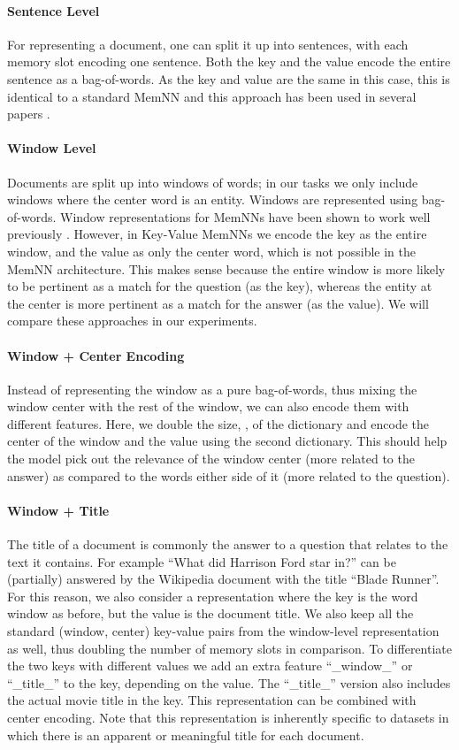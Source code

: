 \documentclass[11pt,letterpaper]{article}
\begin{document}
\paragraph{Sentence Level}
For representing a document, one can
split it up into sentences, with each memory slot encoding one
sentence.  Both the key and the value encode the entire sentence as a
bag-of-words.  As the key and value are the same in this case, this
is identical to a standard MemNN and this approach has been used in
several papers \citep{weston2015towards,dodge2015evaluating}.

\paragraph{Window Level}
Documents are split up into windows of  words; in our tasks we only include
windows where the center word is an entity. Windows are represented using bag-of-words.
Window representations for MemNNs have been shown to work well previously
\citep{hill2015goldilocks}.
However, in Key-Value MemNNs we encode the key as the entire window, and the value
as only the center word, which is not possible in the MemNN architecture.
This makes sense because the entire window is more likely to be pertinent as a match
for the question (as the key), whereas the entity at the center is more pertinent
as a match for the answer (as the value). We will compare these approaches in our
experiments.

\paragraph{Window + Center Encoding}
Instead of representing the window as a pure bag-of-words, thus mixing the window center
with the rest of the window, we can also encode them with different features. Here,
we double the size, , of the dictionary and encode the center of the window and the value
 using the second dictionary. This should help the model pick out the relevance
of the window center (more related to the answer)
as compared to the words either side of it (more related to the question).


\paragraph{Window + Title}
The title of a document is commonly the answer to a question that relates to the text
it contains. For example ``What did Harrison Ford star in?'' can be (partially) answered by the
Wikipedia document with the title ``Blade Runner''. For this reason, we also consider
a representation where the key is the word window as before,
but the value is the document title.
We also keep all the standard (window, center) key-value pairs from the window-level
representation as well, thus doubling the number of memory slots in comparison.
To differentiate the two keys with different values we add an extra feature
``\_window\_'' or ``\_title\_'' to the key, depending on the value.
The ``\_title\_'' version also includes the actual movie title in the key.
This representation can be combined with center encoding. Note that this representation is inherently specific to datasets in which there is an apparent or meaningful title for each document.
 
\end{document}
